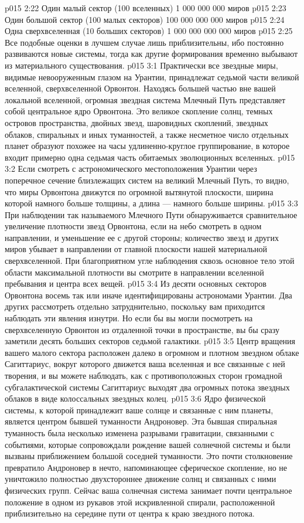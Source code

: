 \vs p015 2:22 Один малый сектор (100 вселенных) 1 000 000 000 миров
\vs p015 2:23 Один большой сектор (100 малых секторов) 100 000 000 000 миров
\vs p015 2:24 Одна сверхвселенная (10 больших секторов) 1 000 000 000 000 миров
\vs p015 2:25 \pc Все подобные оценки в лучшем случае лишь приблизительны, ибо постоянно развиваются новые системы, тогда как другие формирования временно выбывают из материального существования.
\vs p015 3:1 Практически все звездные миры, видимые невооруженным глазом на Урантии, принадлежат седьмой части великой вселенной, сверхвселенной Орвонтон. Находясь большей частью вне вашей локальной вселенной, огромная звездная система Млечный Путь представляет собой центральное ядро Орвонтона. Это великое скопление солнц, темных островов пространства, двойных звезд, шаровидных скоплений, звездных облаков, спиральных и иных туманностей, а также несметное число отдельных планет образуют похожее на часы удлиненно\hyp{}круглое группирование, в которое входит примерно одна седьмая часть обитаемых эволюционных вселенных.
\vs p015 3:2 Если смотреть с астрономического местоположения Урантии через поперечное сечение близлежащих систем на великий Млечный Путь, то видно, что миры Орвонтона движутся по огромной вытянутой плоскости, ширина которой намного больше толщины, а длина --- намного больше ширины.
\vs p015 3:3 При наблюдении так называемого Млечного Пути обнаруживается сравнительное увеличение плотности звезд Орвонтона, если на небо смотреть в одном направлении, и уменьшение ее с другой стороны; количество звезд и других миров убывает в направлении от главной плоскости нашей материальной сверхвселенной. При благоприятном угле наблюдения сквозь основное тело этой области максимальной плотности вы смотрите в направлении вселенной пребывания и центра всех вещей.
\vs p015 3:4 \pc Из десяти основных секторов Орвонтона восемь так или иначе идентифицированы астрономами Урантии. Два других рассмотреть отдельно затруднительно, поскольку вам приходится наблюдать эти явления изнутри. Но если бы вы могли посмотреть на сверхвселенную Орвонтон из отдаленной точки в пространстве, вы бы сразу заметили десять больших секторов седьмой галактики.
\vs p015 3:5 Центр вращения вашего малого сектора расположен далеко в огромном и плотном звездном облаке Сагиттариус, вокруг которого движется ваша вселенная и все связанные с ней творения, и вы можете наблюдать, как с противоположных сторон громадной субгалактической системы Сагиттариус выходят два огромных потока звездных облаков в виде колоссальных звездных колец.
\vs p015 3:6 Ядро физической системы, к которой принадлежит ваше солнце и связанные с ним планеты, является центром бывшей туманности Андроновер. Эта бывшая спиральная туманность была несколько изменена разрывами гравитации, связанными с событиями, которые сопровождали рождение вашей солнечной системы и были вызваны приближением большой соседней туманности. Это почти столкновение превратило Андроновер в нечто, напоминающее сферическое скопление, но не уничтожило полностью двухстороннее движение солнц и связанных с ними физических групп. Сейчас ваша солнечная система занимает почти центральное положение в одном из рукавов этой искривленной спирали, расположенной приблизительно на середине пути от центра к краю звездного потока.
